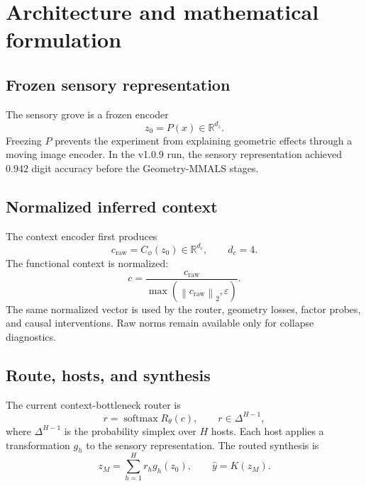 \documentclass[11pt,a4paper]{article}
\newcommand{\R}{\mathbb{R}}
\newcommand{\norm}[1]{\left\lVert #1 \right\rVert}
\newcommand{\softmax}{\operatorname{softmax}}
\begin{document}
\section{Architecture and mathematical formulation}

\subsection{Frozen sensory representation}

The sensory grove is a frozen encoder
\begin{equation}
 z_0=P(x)\in\R^{d_z}.
\end{equation}
Freezing $P$ prevents the experiment from explaining geometric effects through a moving image encoder. In the v1.0.9 run, the sensory representation achieved $0.942$ digit accuracy before the Geometry-MMALS stages.

\subsection{Normalized inferred context}

The context encoder first produces
\begin{equation}
 c_{\mathrm{raw}}=C_\phi(z_0)\in\R^{d_c},\qquad d_c=4.
\end{equation}
The functional context is normalized:
\begin{equation}
 c=\frac{c_{\mathrm{raw}}}{\max(\norm{c_{\mathrm{raw}}}_2,\varepsilon)}.
\end{equation}
The same normalized vector is used by the router, geometry losses, factor probes, and causal interventions. Raw norms remain available only for collapse diagnostics.

\subsection{Route, hosts, and synthesis}

The current context-bottleneck router is
\begin{equation}
 r=\softmax R_\theta(c),\qquad r\in\Delta^{H-1},
\end{equation}
where $\Delta^{H-1}$ is the probability simplex over $H$ hosts. Each host applies a transformation $g_h$ to the sensory representation. The routed synthesis is
\begin{equation}
 z_M=\sum_{h=1}^{H}r_h g_h(z_0),
 \qquad \hat y=K(z_M).
\end{equation}
\end{document}
